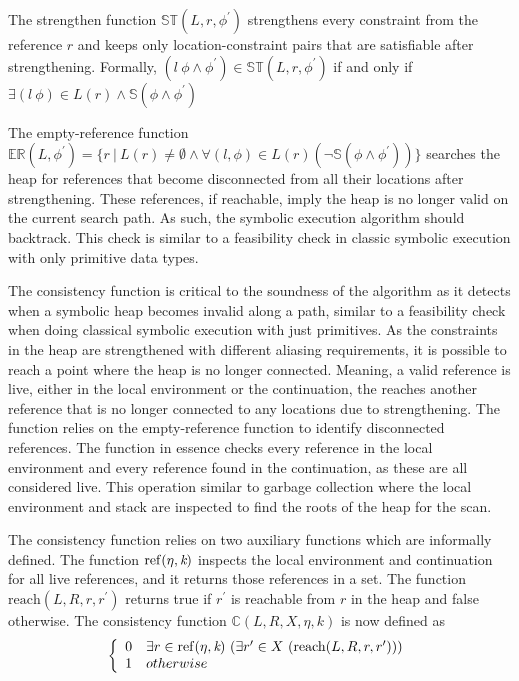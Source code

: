 The strengthen function $\mathbb{ST}(L,r,\phi^\prime)$ strengthens every
constraint from the reference $r$ and keeps only location-constraint
pairs that are satisfiable after strengthening. Formally,
$(l\ \phi\wedge\phi^\prime)\in\mathbb{ST}(L,r,\phi^\prime)$ if and
only if $\exists (l\ \phi)\in
L(r)\wedge\mathbb{S}(\phi\wedge\phi^\prime)$

The empty-reference function $\mathbb{ER}(L,\phi^\prime) = \{r\ |\ L(r) \neq
\emptyset \wedge \forall(l,\phi) \in L(r)(\neg \mathbb{S}(\phi \wedge
\phi^\prime))\}$ searches the heap for references that become
disconnected from all their locations after strengthening. These
references, if reachable, imply the heap is no longer valid on the
current search path. As such, the symbolic execution algorithm should
backtrack. This check is similar to a feasibility check in classic
symbolic execution with only primitive data types.

The consistency function is critical to the soundness of the algorithm
as it detects when a symbolic heap becomes invalid along a path,
similar to a feasibility check when doing classical symbolic execution
with just primitives. As the constraints in the heap are strengthened
with different aliasing requirements, it is possible to reach a point
where the heap is no longer connected. Meaning, a valid reference is
live, either in the local environment or the continuation, the reaches
another reference that is no longer connected to any locations due to
strengthening. The function relies on the empty-reference function to
identify disconnected references. The function in essence checks every
reference in the local environment and every reference found in the
continuation, as these are all considered live. This operation similar
to garbage collection where the local environment and stack are
inspected to find the roots of the heap for the scan.


The consistency function relies on two auxiliary functions which are
informally defined. The function $\mathrm{ref}(\eta,\emph{k})$
inspects the local environment and continuation for all live
references, and it returns those references in a set. The function
$\mathrm{reach}(L, R, r, r^\prime)$ returns true if $r^\prime$ is
reachable from $r$ in the heap and false otherwise. The consistency function $\mathbb{C}(L,R,X,\eta,k)$ is now defined as
\[
 \left\{ \begin{array}{rl} 
        0 & \exists r \in \mathrm{ref}(\eta, \emph{k})\ (\exists r^\prime \in X\ (\mathrm{reach}(L, R, r,r^\prime))) \\ 
        1 & \relax{otherwise}\end{array}\right .
\]
